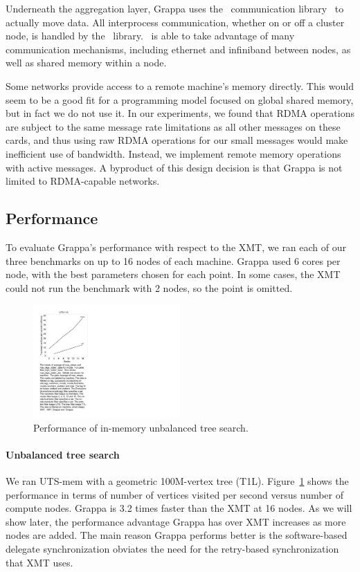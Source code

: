 Underneath the aggregation layer, Grappa uses the \gasnet~communication
library~\cite{gasnet} to actually move data. All interprocess
communication, whether on or off a cluster node, is handled by the
\gasnet~library. \gasnet~is able to take advantage of many communication
mechanisms, including ethernet and infiniband between nodes, as well as
shared memory within a node.

Some networks provide access to a remote machine's memory directly. This
would seem to be a good fit for a programming model focused on global
shared memory, but in fact we do not use it. In our experiments, we
found that RDMA operations are subject to the same message rate
limitations as all other messages on these cards, and thus using raw
RDMA operations for our small messages would make inefficient use of
bandwidth. Instead, we implement remote memory operations with active
messages. A byproduct of this design decision is that Grappa is not
limited to RDMA-capable networks.

\subsection{Performance}

To evaluate Grappa's performance with respect to the XMT, we ran each
of our three benchmarks on up to 16 nodes of each machine. Grappa used
6 cores per node, with the best parameters chosen for each point. In
some cases, the XMT could not run the benchmark with 2 nodes, so the
point is omitted.

\begin{figure}[ht]
    \begin{center}
      \includegraphics[width=0.5\textwidth]{figs/uts_performance.pdf}
    \end{center}
    \caption{Performance of in-memory unbalanced tree search.}
    \label{fig:uts_compare}
\end{figure}

\paragraph{Unbalanced tree search} We ran UTS-mem with a geometric 100M-vertex tree
(T1L). Figure~\ref{fig:uts_compare} shows the performance in terms of
number of vertices visited per second versus number of compute
nodes. Grappa is 3.2 times faster than the XMT at 16 nodes.  As we will show later, the performance advantage Grappa has over XMT increases as more nodes are added.  The main reason Grappa performs better is the software-based delegate synchronization obviates the need for the retry-based synchronization that XMT uses.

